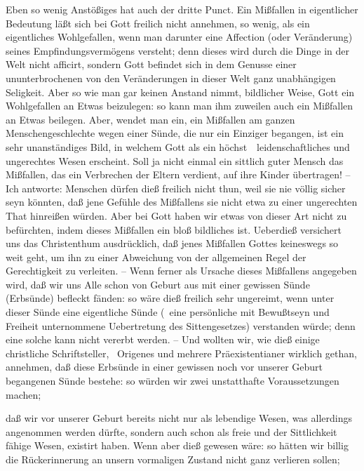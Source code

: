\begin{aufza}
\item Eben so wenig Anstößiges hat auch der dritte Punct. Ein Mißfallen in eigentlicher Bedeutung läßt sich bei Gott freilich nicht annehmen, so wenig, als ein eigentliches Wohlgefallen, wenn man darunter eine Affection (oder Veränderung) seines Empfindungsvermögens versteht; denn dieses wird durch die Dinge in der Welt nicht afficirt, sondern Gott befindet sich in dem Genusse einer ununterbrochenen von den Veränderungen in dieser Welt ganz unabhängigen Seligkeit. Aber so wie man gar keinen Anstand nimmt, bildlicher Weise, Gott ein Wohlgefallen an Etwas beizulegen: so kann man ihm zuweilen auch ein Mißfallen an Etwas beilegen. Aber, wendet man ein, ein Mißfallen am ganzen Menschengeschlechte wegen einer Sünde, die nur ein Einziger begangen, ist ein sehr unanständiges Bild, in welchem Gott als ein höchst~\ leidenschaftliches und ungerechtes Wesen erscheint. Soll ja nicht einmal ein sittlich guter Mensch das Mißfallen, das ein Verbrechen der Eltern verdient, auf ihre Kinder übertragen! -- Ich antworte: Menschen dürfen dieß freilich nicht thun, weil sie nie völlig sicher seyn könnten, daß jene Gefühle des Mißfallens sie nicht etwa zu einer ungerechten That hinreißen würden. Aber bei Gott haben wir etwas von dieser Art nicht zu befürchten, indem dieses Mißfallen ein bloß bildliches ist. Ueberdieß versichert uns das Christenthum ausdrücklich, daß jenes Mißfallen Gottes keineswegs so weit geht, um ihn zu einer Abweichung von der allgemeinen Regel der Gerechtigkeit zu verleiten. -- Wenn ferner als Ursache dieses Mißfallens angegeben wird, daß wir uns Alle schon von Geburt aus mit einer gewissen Sünde (Erbsünde) befleckt fänden: so wäre dieß freilich sehr ungereimt, wenn unter dieser Sünde eine eigentliche Sünde (\dh\ eine persönliche mit Bewußtseyn und Freiheit unternommene Uebertretung des Sittengesetzes) verstanden würde; denn eine solche kann nicht vererbt werden. -- Und wollten wir, wie dieß einige christliche Schriftsteller, \zB\ Origenes und mehrere Präexistentianer wirklich gethan, annehmen, daß diese Erbsünde in einer gewissen noch vor unserer Geburt begangenen Sünde bestehe: so würden wir zwei unstatthafte Voraussetzungen machen;
\begin{aufzb}
\item daß wir vor unserer Geburt bereits nicht nur als lebendige Wesen, was allerdings angenommen werden dürfte, sondern auch schon als freie und der Sittlichkeit fähige Wesen, existirt haben. Wenn aber dieß gewesen wäre: so hätten wir billig die Rückerinnerung an unsern vormaligen Zustand nicht ganz verlieren sollen;

\end{aufzb}
\end{aufza}
